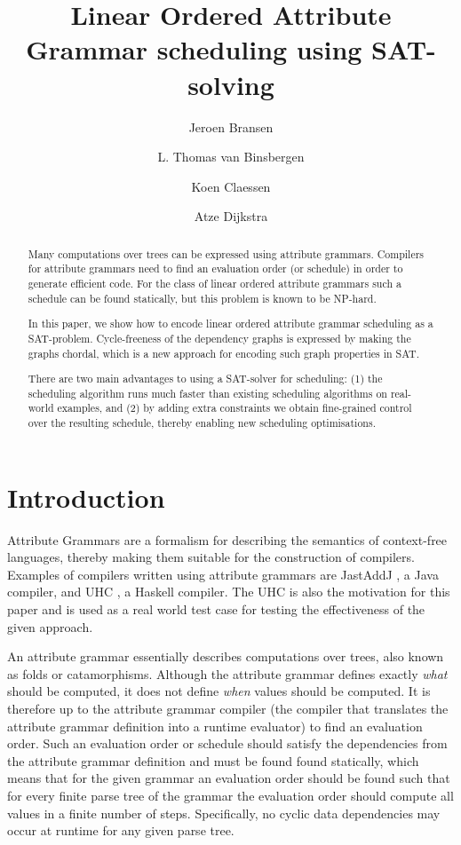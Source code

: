 \documentclass{llncs}
\title{Linear Ordered Attribute Grammar scheduling using SAT-solving}
\author{Jeroen Bransen\inst{1}  \and L. Thomas van Binsbergen\inst{2,1} \and Koen Claessen\inst{3} \and Atze Dijkstra\inst{1}}
\institute{Utrecht University, Utrecht, The Netherlands, \email{\{J.Bransen,atze\}@uu.nl}
\and Royal Holloway, University of London, Egham, UK, \email{Thomas.VanBinsbergen.2014@live.rhul.ac.uk}
\and Chalmers University of Technology, Gothenburg, Sweden, \email{koen@chalmers.se}}
\begin{document}
\maketitle

\begin{abstract}
Many computations over trees can be expressed using attribute
grammars. Compilers for attribute grammars need to find an evaluation
order (or schedule) in order to generate efficient code. For the class
of linear ordered attribute grammars such a schedule can be found
statically, but this problem is known to be NP-hard.

In this paper, we show how to encode linear ordered attribute grammar
scheduling as a SAT-problem. Cycle-freeness of the dependency graphs
is expressed by making the graphs chordal, which is a new approach for
encoding such graph properties in SAT.

There are two main advantages to using a SAT-solver for scheduling:
(1) the scheduling algorithm runs much faster than existing scheduling
algorithms on real-world examples, and (2) by adding extra constraints
we obtain fine-grained control over the resulting schedule, thereby
enabling new scheduling optimisations.


\end{abstract}

\section{Introduction}
Attribute Grammars \cite{knuth68} are a formalism for describing the semantics of context-free languages, thereby making them suitable for the construction of compilers. Examples of compilers written using attribute grammars are JastAddJ \cite{Ekman:2007}, a Java compiler, and UHC \cite{Dijkstra:2009}, a Haskell compiler. The UHC is also the motivation for this paper and is used as a real world test case for testing the effectiveness of the given approach.

An attribute grammar essentially describes computations over trees, also known as folds or catamorphisms. Although the attribute grammar defines exactly \emph{what} should be computed, it does not define \emph{when} values should be computed. It is therefore up to the attribute grammar compiler (the compiler that translates the attribute grammar definition into a runtime evaluator) to find an evaluation order. Such an evaluation order or schedule should satisfy the dependencies from the attribute grammar definition and must be found found statically, which means that for the given grammar an evaluation order should be found such that for every finite parse tree of the grammar the evaluation order should compute all values in a finite number of steps. Specifically, no cyclic data dependencies may occur at runtime for any given parse tree.
\end{document}
